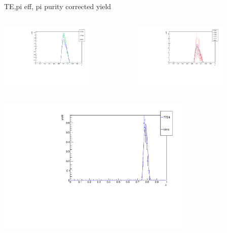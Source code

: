 \begin{frame}{TE,pi eff, pi purity corrected yield}
\begin{columns}
\begin{column}[T]{0.5\textwidth}
\includegraphics[width = 0.7\textwidth]{results/yield/check/yieldcheck_500_neg.pdf}
\end{column}
\begin{column}[T]{0.5\textwidth}
\includegraphics[width = 0.7\textwidth]{results/yield/check/yieldcheck_500_pos.pdf}
\end{column}
\end{columns}
\begin{columns}
\begin{column}[T]{0.5\textwidth}
\includegraphics[width = 0.7\textwidth]{results/yield/check/yieldcheck_490_neg.pdf}

\end{column}
\end{columns}
\end{frame}
